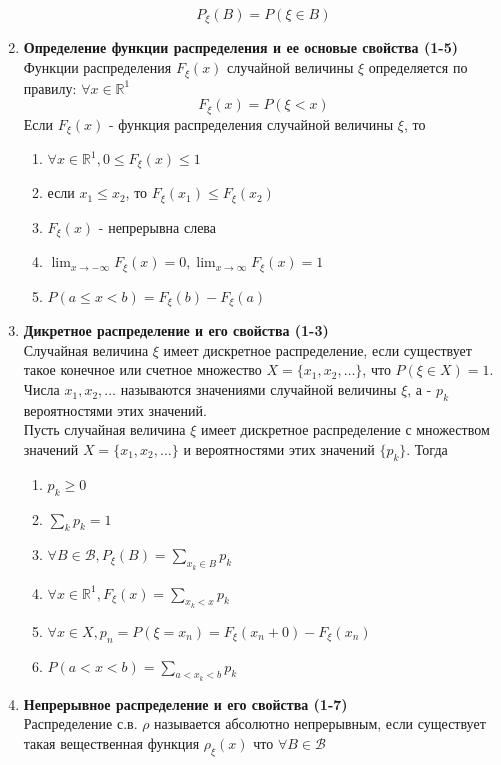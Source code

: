 \documentclass[A4]{article}
\begin{document}
\begin{enumerate}
\begin{equation}
	P_{\xi}(B)=P(\xi\in B)
	\end{equation}
	\item \textbf{Определение функции распределения и ее основые свойства (1-5)}\\
	Функции распределения $F_{\xi}(x)$ случайной величины $\xi$ определяется по правилу: $\forall x\in \mathbb{R}^1$
	\begin{equation}
	F_{\xi}(x)=P(\xi<x)
	\end{equation}
	Если $F_{\xi}(x)$ - функция распределения случайной величины $\xi$, то 
	\begin{enumerate}
		\item $\forall x\in \mathbb{R}^1,0\le F_{\xi}(x)\le1$
		\item если $x_1\le x_2$, то $F_{\xi}(x_1)\le F_{\xi}(x_2)$
		\item $F_{\xi}(x)$ - непрерывна слева
		\item $\lim_{x\rightarrow-\infty} F_{\xi}(x)=0,\lim_{x\rightarrow\infty} F_{\xi}(x)=1$
		\item $P(a\le x< b)=F_{\xi}(b)-F_{\xi}(a)$
	\end{enumerate}
	\item \textbf{Дикретное распределение и его свойства (1-3)}\\
	Случайная величина $\xi$ имеет дискретное распределение, если существует такое конечное или счетное множество $X=\{x_1,x_2,\ldots\}$, что $P(\xi\in X)=1$. Числа $x_1,x_2,\ldots $ называются значениями случайной величины $\xi$, а - $p_k$ вероятностями этих значений.\\
	Пусть случайная величина $\xi$ имеет дискретное распределение с множеством значений $X=\{x_1,x_2,\ldots\}$ и вероятностями этих значений $\{p_k\}$. Тогда
	\begin{enumerate}
		\item $p_k\ge 0$
		\item $\sum_{k} p_k=1$
		\item $\forall B\in\mathcal{B}, P_{\xi}(B)=\sum_{x_k\in B}p_k$
		\item $\forall x \in \mathbb{R}^1, F_{\xi}(x)=\sum_{x_k<x}p_k$
		\item $\forall x\in X, p_n=P(\xi=x_n)=F_{\xi}(x_n+0)-F_{\xi}(x_n)$
		\item $P(a<x<b)=\sum_{a<x_k<b} p_k$ 
	\end{enumerate}
	\item \textbf{Непрерывное распределение и его свойства (1-7)}\\
	Распределение с.в. $\rho$ называется абсолютно непрерывным, если существует такая вещественная функция $\rho_{\xi}(x)$ что $\forall B\in\mathcal{B}$

\end{enumerate}
\end{document}
